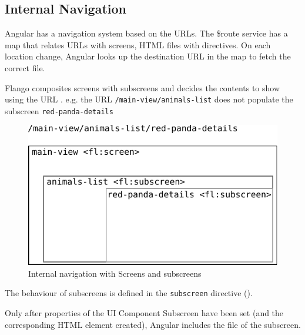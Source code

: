
\subsection{Internal Navigation}
Angular has a navigation system based on the \acp{URL}.
The \$route service has a map that relates \acp{URL} with screens, \ac{HTML} files with directives.
On each location change, Angular looks up the destination \ac{URL} in the map to fetch the correct file.

Flango \cm composites screens with subscreens and decides the contents to show using the \ac{URL} .
e.g. the \ac{URL} \texttt{/main-view/animals-list} does not populate the subscreen \texttt{red-panda-details}

\begin{figure}[htb]
    \centering
    \includegraphics{figures/design/internal-navigation.pdf}
    \caption{Internal navigation with Screens and subscreens}
    \label{fig:design-internal-navigation}
\end{figure}

The behaviour of subscreens is defined in the \texttt{subscreen} directive ().

Only after properties of the UI Component Subscreen have been set (and the corresponding \ac{HTML} element created), Angular includes the file of the subscreen.

